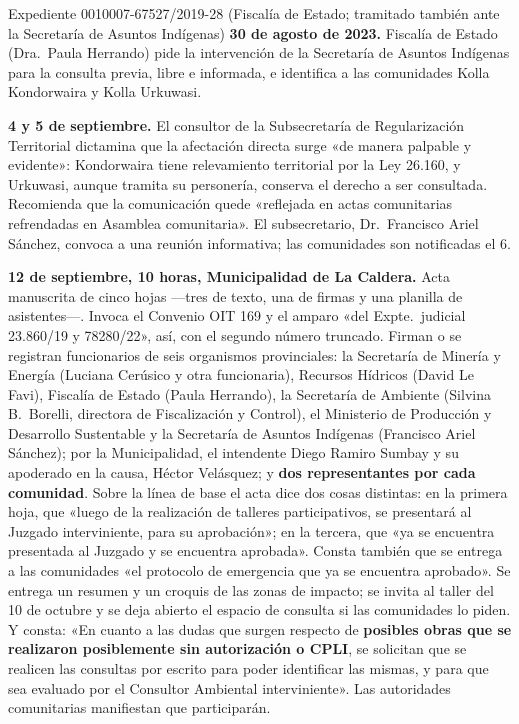 \begin{ficha}{Expediente 0010007-67527/2019-28 (Fiscalía de Estado; tramitado también ante la Secretaría de Asuntos Indígenas)}
\textbf{30 de agosto de 2023.} Fiscalía de Estado (Dra.\ Paula Herrando) pide la intervención de la Secretaría de Asuntos Indígenas para la consulta previa, libre e informada, e identifica a las comunidades Kolla Kondorwaira y Kolla Urkuwasi.

\textbf{4 y 5 de septiembre.} El consultor de la Subsecretaría de Regularización Territorial dictamina que la afectación directa surge «de manera palpable y evidente»: Kondorwaira tiene relevamiento territorial por la Ley 26.160, y Urkuwasi, aunque tramita su personería, conserva el derecho a ser consultada. Recomienda que la comunicación quede «reflejada en actas comunitarias refrendadas en Asamblea comunitaria». El subsecretario, Dr.\ Francisco Ariel Sánchez, convoca a una reunión informativa; las comunidades son notificadas el 6.

\textbf{12 de septiembre, 10 horas, Municipalidad de La Caldera.} Acta manuscrita de cinco hojas ---tres de texto, una de firmas y una planilla de asistentes---. Invoca el Convenio OIT 169 y el amparo «del Expte.\ judicial 23.860/19 y 78280/22», así, con el segundo número truncado. Firman o se registran funcionarios de seis organismos provinciales: la Secretaría de Minería y Energía (Luciana Cerúsico y otra funcionaria), Recursos Hídricos (David Le Favi), Fiscalía de Estado (Paula Herrando), la Secretaría de Ambiente (Silvina B.\ Borelli, directora de Fiscalización y Control), el Ministerio de Producción y Desarrollo Sustentable y la Secretaría de Asuntos Indígenas (Francisco Ariel Sánchez); por la Municipalidad, el intendente Diego Ramiro Sumbay y su apoderado en la causa, Héctor Velásquez; y \textbf{dos representantes por cada comunidad}. Sobre la línea de base el acta dice dos cosas distintas: en la primera hoja, que «luego de la realización de talleres participativos, se presentará al Juzgado interviniente, para su aprobación»; en la tercera, que «ya se encuentra presentada al Juzgado y se encuentra aprobada». Consta también que se entrega a las comunidades «el protocolo de emergencia que ya se encuentra aprobado». Se entrega un resumen y un croquis de las zonas de impacto; se invita al taller del 10 de octubre y se deja abierto el espacio de consulta si las comunidades lo piden. Y consta: «En cuanto a las dudas que surgen respecto de \textbf{posibles obras que se realizaron posiblemente sin autorización o CPLI}, se solicitan que se realicen las consultas por escrito para poder identificar las mismas, y para que sea evaluado por el Consultor Ambiental interviniente». Las autoridades comunitarias manifiestan que participarán.


\end{ficha}
